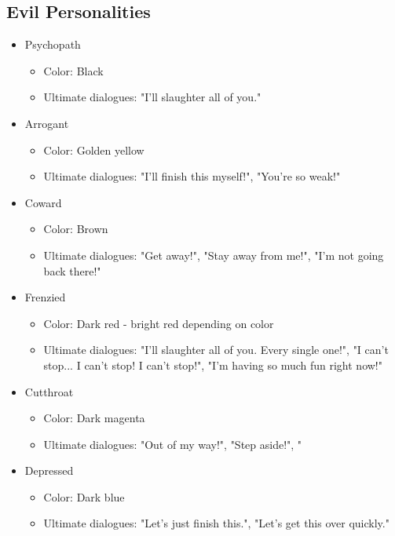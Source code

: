 \documentclass{report}
\begin{document}
        \subsection{Evil Personalities}
        \begin{itemize}
            \item Psychopath \begin{itemize}
                \item Color: Black 
                \item Ultimate dialogues: "I'll slaughter all of you."
            \end{itemize}

            \item Arrogant \begin{itemize}
                \item Color: Golden yellow
                \item Ultimate dialogues: "I'll finish this myself!", "You're so weak!"
            \end{itemize}

            \item Coward \begin{itemize}
                \item Color: Brown
                \item Ultimate dialogues: "Get away!", "Stay away from me!", "I'm not going back there!"
            \end{itemize}

            \item Frenzied \begin{itemize}
                \item Color: Dark red - bright red depending on color
                \item Ultimate dialogues: "I'll slaughter all of you. Every single one!", "I can't stop... I can't stop! I can't stop!", "I'm having so much fun right now!"
            \end{itemize}            

            \item Cutthroat \begin{itemize}
                \item Color: Dark magenta
                \item Ultimate dialogues: "Out of my way!", "Step aside!", "
            \end{itemize}      

            \item Depressed \begin{itemize}
                \item Color: Dark blue
                \item Ultimate dialogues: "Let's just finish this.", "Let's get this over quickly."
            \end{itemize} 


        \end{itemize}
            
\end{document}
